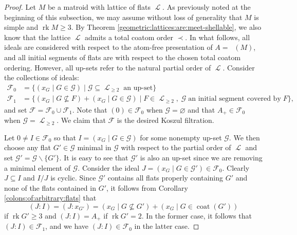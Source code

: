 \documentclass[11pt, reqno]{amsart}
\DeclareMathOperator{\Chow}{\underline{CH}}		%
\DeclareMathOperator{\coat}{coat}
\renewcommand{\emptyset}{\varnothing}
\DeclareMathOperator{\LL}{\mathcal{L}}
\DeclareMathOperator{\rk}{rk}
\renewcommand{\setminus}{\smallsetminus}
\theoremstyle{definition}
\numberwithin{equation}{section}
\numberwithin{table}{section}
\begin{document}
\begin{spacing}{1.1}
\begin{proof}
Let $M$ be a matroid with lattice of flats $\LL$.  As previously noted at the beginning of this subsection, we may assume without loss of generality that $M$ is simple and $\rk M \geq 3$.  By Theorem \ref{geometric:lattices:are:meet-shellable}, we also know that the lattice $\LL$ admits a total coatom order $\prec$.  In what follows, all ideals are considered with respect to the atom-free presentation of $A = \Chow(M)$, and all initial segments of flats are with respect to the chosen total coatom ordering.  However, all up-sets refer to the natural partial order of $\LL$.  Consider the collections of ideals:
\begin{align*} 
\mathcal{F}_0 &= \{(x_G \mid G \in \mathcal{G}) \mid \mathcal{G} \subseteq \LL_{\geq 2} \;\text{an up-set} \} \\
\mathcal{F}_1 &= \{(x_G \mid G \nsubseteq F) + (x_G \mid G \in \mathcal{G}) \mid F \in \LL_{\geq 2}, \;\mathcal{G} \; \text{an initial segment covered by}\; F \},
\end{align*}
and set $\mathcal{F} = \mathcal{F}_0 \cup \mathcal{F}_1$. Note that $(0) \in \mathcal{F}_0$ when $\mathcal{G} = \emptyset$ and that $A_+ \in \mathcal{F}_0$ when $\mathcal{G} = \LL_{\geq 2}$.  We claim that $\mathcal{F}$ is the desired Koszul filtration. 

Let $0 \neq I \in \mathcal{F}_0$ so that $I = (x_G \mid G \in \mathcal{G})$ for some nonempty up-set $\mathcal{G}$.  We then choose any flat $G' \in \mathcal{G}$ minimal in $\mathcal{G}$ with respect to the partial order of $\LL$ and set $\mathcal{G}' = \mathcal{G} \setminus \{G'\}$.  It is easy to see that $\mathcal{G}'$ is also an up-set since we are removing a minimal element of $\mathcal{G}$.   Consider the ideal $J = (x_G \mid G \in \mathcal{G}') \in \mathcal{F}_0$.  Clearly $J \subseteq I$ and $I/J$ is cyclic.  Since $\mathcal{G}'$ contains all flats properly containing $G'$ and none of the flats contained in $G'$, it follows from Corollary \ref{colons:of:arbitrary:flats} that
\[ (J : I) = (J : x_{G'}) = (x_G \mid G \nsubseteq G') + (x_G \mid G \in \coat(G') ) \]
if $\rk G' \geq 3$ and $(J : I) = A_+$ if $\rk G' = 2$.  In the former case, it follows that $(J : I) \in \mathcal{F}_1$, and we have $(J : I) \in \mathcal{F}_0$ in the latter case. 


\end{proof}
\end{spacing}
\end{document}
